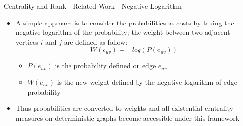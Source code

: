 \documentclass[9pt]{beamer}
\newcommand{\themename}{\textbf{\textsc{metropolis}}\xspace}
\begin{document}




\begin{frame}{Centrality and Rank - Related Work - Negative Logarithm \cite{potamias2009nearest}}
\begin{itemize}
\item A simple approach is to consider the probabilities
as costs by taking the negative logarithm of the probability; the weight between two adjacent vertices $i$ and $j$ are defined as follow:
\begin{equation*}
W(e_{uv}) = -log(P(e_{uv}))
\end{equation*}
\vspace{-0.2in}
\begin{itemize}
\item $P(e_{uv})$ is the probability defined on edge $e_{uv}$
\item $W(e_{uv})$ is the new weight defined by the negative logarithm of edge probability
\end{itemize}
\item Thus probabilities are converted to weights and all existential centrality measures on deterministic graphs become accessible under this framework
\end{itemize}
\end{frame}
\end{document}
